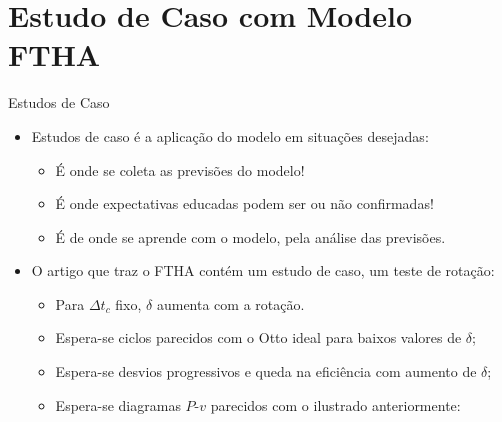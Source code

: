 \section{Estudo de Caso com Modelo FTHA}

    \begin{frame}{Estudos de Caso}\vspace*{-2em}
        \begin{itemize}
            \item<1-> \alert{Estudos de caso} é a \alert{aplicação} do modelo em
                \alert{situações desejadas}:
                \begin{itemize}
                    \item<2-> É onde se coleta as \alert{previsões} do modelo!
                    \item<3-> É onde \alert{expectativas} educadas podem ser ou não confirmadas!
                    \item<4-> É de onde se \alert{aprende} com o modelo, pela \alert{análise das
                        previsões}.
                \end{itemize}
            \item<5-> O artigo que traz o FTHA contém um estudo de caso, um \alert{teste de
                rotação}:
                \begin{itemize}
                    \item<6-> Para $\Delta t_c$ fixo, \alert{$\delta$ aumenta com a rotação}.
                    \item<7-> \alert{Espera-se} ciclos parecidos com o Otto ideal para baixos
                        valores de $\delta$;
                    \item<8-> \alert{Espera-se} desvios progressivos e queda na eficiência com
                        aumento de $\delta$;
                    \item<9-> \alert{Espera-se} diagramas $P$-$v$ parecidos com o ilustrado
                        anteriormente:
                \end{itemize}
        \end{itemize}
    \end{frame}


